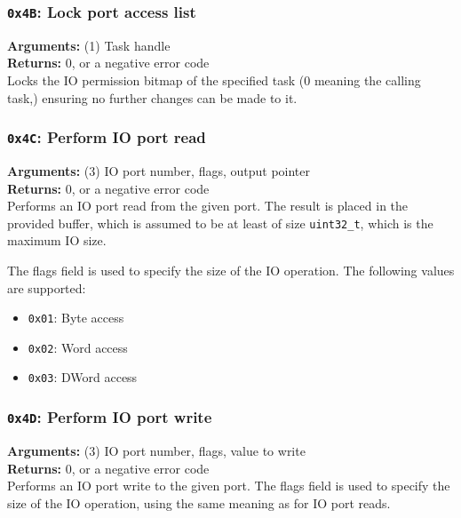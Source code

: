 \documentclass[11pt]{article}
\begin{document}
\subsubsection{{\tt 0x4B}: Lock port access list}
\textbf{Arguments:} (1) Task handle \\
\textbf{Returns:} 0, or a negative error code \\

Locks the IO permission bitmap of the specified task (0 meaning the calling task,) ensuring no further changes can be made to it.

\subsubsection{{\tt 0x4C}: Perform IO port read}
\textbf{Arguments:} (3) IO port number, flags, output pointer \\
\textbf{Returns:} 0, or a negative error code \\

Performs an IO port read from the given port. The result is placed in the provided buffer, which is assumed to be at least of size \texttt{uint32\_t}, which is the maximum IO size.

The flags field is used to specify the size of the IO operation. The following values are supported:
\begin{itemize}
\item \texttt{0x01}: Byte access
\item \texttt{0x02}: Word access
\item \texttt{0x03}: DWord access
\end{itemize}

\subsubsection{{\tt 0x4D}: Perform IO port write}
\textbf{Arguments:} (3) IO port number, flags, value to write \\
\textbf{Returns:} 0, or a negative error code \\

Performs an IO port write to the given port. The flags field is used to specify the size of the IO operation, using the same meaning as for IO port reads.
\end{document}
